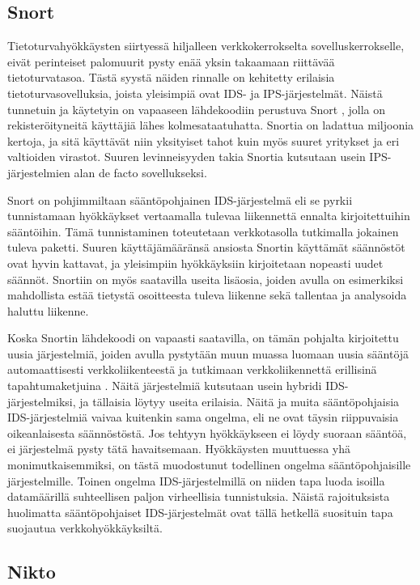 \subsection{Snort}

Tietoturvahyökkäysten siirtyessä hiljalleen verkkokerrokselta sovelluskerrokselle, eivät perinteiset palomuurit pysty enää yksin takaamaan riittävää tietoturvatasoa. Tästä syystä näiden
rinnalle on kehitetty erilaisia tietoturvasovelluksia, joista yleisimpiä ovat IDS- ja IPS-järjestelmät. Näistä tunnetuin ja käytetyin on vapaaseen lähdekoodiin perustuva Snort \cite{Snort}, jolla 
on rekisteröityneitä käyttäjiä lähes kolmesataatuhatta. Snortia on ladattua miljoonia kertoja, ja sitä käyttävät niin yksityiset tahot kuin myös suuret yritykset ja eri valtioiden virastot. Suuren
levinneisyyden takia Snortia kutsutaan usein IPS-järjestelmien alan de facto sovellukseksi.

Snort on pohjimmiltaan sääntöpohjainen IDS-järjestelmä eli se pyrkii tunnistamaan hyökkäykset vertaamalla tulevaa liikennettä ennalta kirjoitettuihin sääntöihin. Tämä tunnistaminen toteutetaan
verkkotasolla tutkimalla jokainen tuleva paketti. Suuren käyttäjämääränsä ansiosta Snortin käyttämät säännöstöt ovat hyvin kattavat, ja yleisimpiin hyökkäyksiin kirjoitetaan
nopeasti uudet säännöt. Snortiin on myös saatavilla useita lisäosia, joiden avulla on esimerkiksi mahdollista estää tietystä osoitteesta tuleva liikenne sekä tallentaa ja analysoida haluttu liikenne. 

Koska Snortin lähdekoodi on vapaasti saatavilla, on tämän pohjalta kirjoitettu uusia järjestelmiä, joiden avulla pystytään muun muassa luomaan uusia sääntöjä automaattisesti verkkoliikenteestä 
\cite{SnortRule} ja tutkimaan verkkoliikennettä erillisinä tapahtumaketjuina \cite{SnortSet}. Näitä järjestelmiä kutsutaan usein hybridi IDS-järjestelmiksi, ja tällaisia löytyy useita erilaisia. 
Näitä ja muita sääntöpohjaisia IDS-järjestelmiä vaivaa kuitenkin sama ongelma, eli ne ovat täysin riippuvaisia oikeanlaisesta säännöstöstä. Jos tehtyyn hyökkäykseen ei löydy suoraan sääntöä, 
ei järjestelmä pysty tätä havaitsemaan. Hyökkäysten muuttuessa yhä monimutkaisemmiksi, on tästä muodostunut todellinen ongelma sääntöpohjaisille järjestelmille. Toinen ongelma IDS-järjestelmillä
on niiden tapa luoda isoilla datamäärillä suhteellisen paljon virheellisia tunnistuksia. Näistä rajoituksista huolimatta sääntöpohjaiset IDS-järjestelmät ovat tällä hetkellä suosituin tapa
suojautua verkkohyökkäyksiltä. 

\subsection{Nikto}

